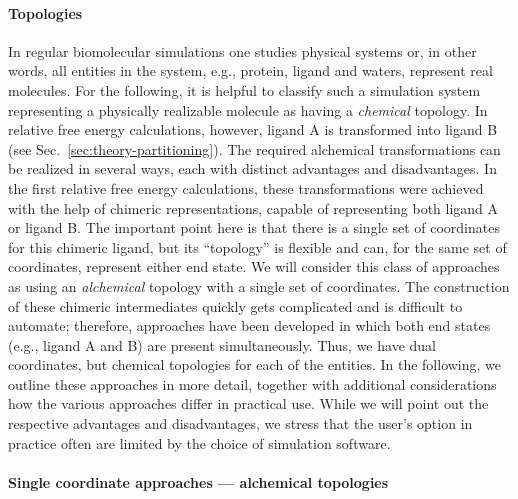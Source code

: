 \documentclass[9pt,bestpractices]{livecoms}
\begin{document}
\paragraph{Topologies} In regular biomolecular simulations one studies physical systems or, in other words, all entities in the system, e.g., protein, ligand and waters, represent real molecules. For the following, it is helpful to classify such a simulation system representing a physically realizable molecule as having a {\em chemical} topology. In relative free energy calculations, however, ligand A is transformed into ligand B (see Sec.~\ref{sec:theory-partitioning}). The required alchemical transformations can be realized in several ways, each with distinct advantages and disadvantages. In the first relative free energy calculations, these transformations were achieved with the help of chimeric representations, capable of representing both ligand A or ligand B. The important point here is that there is a single set of coordinates for this chimeric ligand, but its ``topology'' is flexible and can, for the same set of coordinates, represent either end state. We will consider this class of approaches as using an {\em alchemical} topology with a single set of coordinates. The construction of these chimeric intermediates quickly gets complicated and is difficult to automate; therefore, approaches have been developed in which both end states (e.g., ligand A and B) are present simultaneously. Thus, we have dual coordinates, but chemical topologies for each of the entities. In the following, we outline these approaches in more detail, together with additional considerations how the various approaches differ in practical use. While we will point out the respective advantages and disadvantages, we stress that the user's option in practice often are limited by the choice of simulation software.

\paragraph{Single coordinate approaches --- alchemical topologies}
\end{document}
